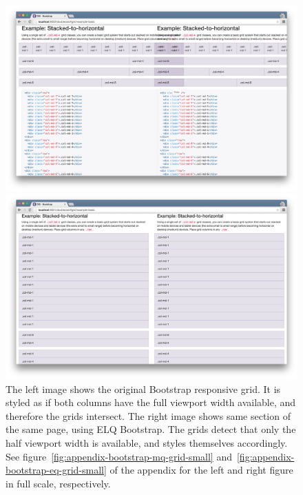 \documentclass[a4paper,11pt]{kth-mag}
\begin{document}
      \begin{figure}[htb!]
        \centering
        \begin{minipage}{.5\textwidth}
          \centering
          \includegraphics[width=\linewidth]{images/bootstrap-mq-grid}
        \end{minipage}%
        \begin{minipage}{.5\textwidth}
          \centering
          \includegraphics[width=\linewidth]{images/bootstrap-eq-grid}
        \end{minipage}
        \caption{
          The left image shows the original \gls{Bootstrap} \gls{responsive} grid.
          It is styled as if both columns have the full \gls{viewport} width available, and therefore the grids intersect.
          The right image shows same section of the same page, using \gls{ELQ} \gls{Bootstrap}.
          The grids detect that only the half \gls{viewport} width is available, and styles themselves accordingly.
          See figure~\ref{fig:appendix-bootstrap-mq-grid-small} and~\ref{fig:appendix-bootstrap-eq-grid-small} of the appendix for the left and right figure in full scale, respectively.
        }
        \label{fig:eval-bootstrap-mq-eq-grid}
      \end{figure}
\end{document}
